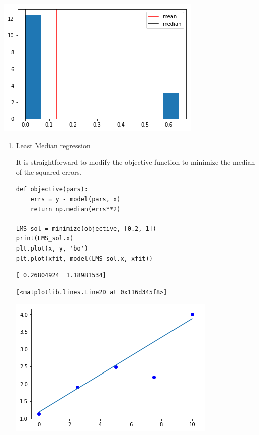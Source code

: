\documentclass[11pt]{article}
\begin{document}
\begin{center}
\includegraphics[width=.9\linewidth]{obipy-resources/37c51028cef42d76546d882661b04271-20264ypa.png}
\end{center}

\begin{enumerate}
\item Least Median regression
\label{sec:org184f2b4}

It is straightforward to modify the objective function to minimize the median of the squared errors.

\begin{verbatim}
def objective(pars):
    errs = y - model(pars, x)
    return np.median(errs**2)

LMS_sol = minimize(objective, [0.2, 1])
print(LMS_sol.x)
plt.plot(x, y, 'bo')
plt.plot(xfit, model(LMS_sol.x, xfit))
\end{verbatim}

\begin{verbatim}
[ 0.26804924  1.18981534]

\end{verbatim}

\begin{verbatim}
[<matplotlib.lines.Line2D at 0x116d345f8>]
\end{verbatim}



\begin{center}
\includegraphics[width=.9\linewidth]{obipy-resources/37c51028cef42d76546d882661b04271-20264XNT.png}
\end{center}
\end{enumerate}
\end{document}
